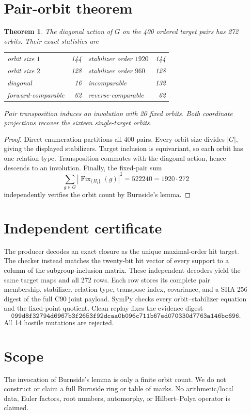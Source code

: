 \documentclass[10pt]{article}
\newtheorem{theorem}{Theorem}
\begin{document}
\section{Pair-orbit theorem}
\begin{theorem}
The diagonal action of $G$ on the 400 ordered target pairs has 272 orbits.
Their exact statistics are
\begin{center}
\begin{tabular}{lr@{\qquad}lr}
\toprule
orbit size $1$ & 144 & stabilizer order $1920$ & 144\\
orbit size $2$ & 128 & stabilizer order $960$ & 128\\
\midrule
diagonal & 16 & incomparable & 132\\
forward-comparable & 62 & reverse-comparable & 62\\
\bottomrule
\end{tabular}
\end{center}
Pair transposition induces an involution with 20 fixed orbits.  Both
coordinate projections recover the sixteen single-target orbits.
\end{theorem}
\begin{proof}
Direct enumeration partitions all 400 pairs.  Every orbit size divides
$|G|$, giving the displayed stabilizers.  Target inclusion is equivariant,
so each orbit has one relation type.  Transposition commutes with the
diagonal action, hence descends to an involution.  Finally, the fixed-pair sum
\[
 \sum_{g\in G}|\operatorname{Fix}_{\{H_i\}}(g)|^2
   =522240=1920\cdot272
\]
independently verifies the orbit count by Burnside's lemma.
\end{proof}

\section{Independent certificate}
The producer decodes an exact closure as the unique maximal-order hit target.
The checker instead matches the twenty-bit hit vector of every support to a
column of the subgroup-inclusion matrix.  These independent decoders yield
the same target maps and all 272 rows.  Each row stores its complete pair
membership, stabilizer, relation type, transpose index, covariance, and a
SHA-256 digest of the full C90 joint payload.  SymPy checks every
orbit--stabilizer equation and the fixed-point quotient.  Clean replay fixes
the evidence digest
\[
\texttt{099d8f32794d6967b3f2653f92dcaa0b096c711b67ed070330d7763a146bc696}.
\]
All 14 hostile mutations are rejected.

\section{Scope}
The invocation of Burnside's lemma is only a finite orbit count.  We do not
construct or claim a full Burnside ring or table of marks.  No
arithmetic/local data, Euler factors, root numbers, automorphy, or
Hilbert--Polya operator is claimed.
\end{document}

